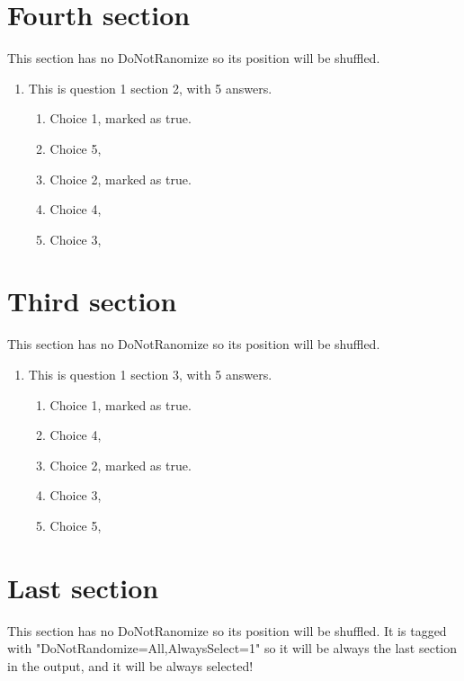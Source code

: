 \documentclass[a4paper,10pt]{article}%
\begin{document}
\section{Fourth section}
This section has no DoNotRanomize so its position will be shuffled.
\begin{enumerate}[resume]
	
\item  This is question 1 section 2, with 5 answers.
	
\begin{enumerate}
\item  Choice 1, marked as true. %
		\item  Choice 5,
	\item  Choice 2, marked as true. %
		\item  Choice 4,
		\item  Choice 3, 
		\end{enumerate}
\end{enumerate}
\section{Third section}
This section has no DoNotRanomize so its position will be shuffled.
\begin{enumerate}[resume]
	
\item  This is question 1 section 3, with 5 answers.
	
\begin{enumerate}
\item  Choice 1, marked as true. %
		\item  Choice 4,
		\item  Choice 2, marked as true. %
		\item  Choice 3, 
		\item  Choice 5,
	\end{enumerate}
\end{enumerate}
\section{Last section}
This section has no DoNotRanomize so its position will be shuffled.
It is tagged with "DoNotRandomize=All,AlwaysSelect=1" so it will be always the last section in the output, and it will be always selected!
\end{document}
